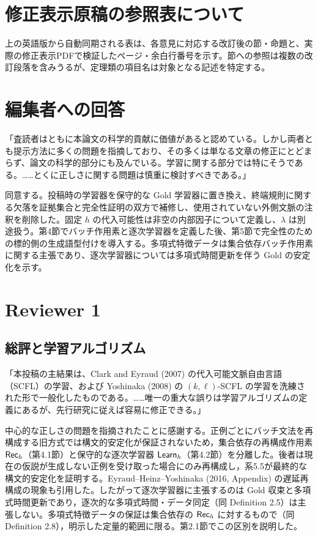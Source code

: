 
\section*{修正表示原稿の参照表について}
上の英語版から自動同期される表は、各意見に対応する改訂後の節・命題と、実際の修正表示PDFで検証したページ・余白行番号を示す。節への参照は複数の改訂段落を含みうるが、定理類の項目名は対象となる記述を特定する。

\section*{編集者への回答}
「査読者はともに本論文の科学的貢献に価値があると認めている。しかし両者とも提示方法に多くの問題を指摘しており、その多くは単なる文章の修正にとどまらず、論文の科学的部分にも及んでいる。学習に関する部分では特にそうである。……とくに正しさに関する問題は慎重に検討すべきである。」

\Reply
同意する。投稿時の学習器を保守的な Gold 学習器に置き換え、終端規則に関する欠落を証拠集合と完全性証明の双方で補修し、使用されていない外側文脈の注釈を削除した。固定 $h$ の代入可能性は非空の内部因子について定義し、$\lambda$ は別途扱う。第4節でバッチ作用素と逐次学習器を定義した後、第5節で完全性のための標的側の生成語型付けを導入する。多項式特徴データは集合依存バッチ作用素に関する主張であり、逐次学習器については多項式時間更新を伴う Gold の安定化を示す。

\section*{Reviewer 1}
\subsection*{総評と学習アルゴリズム}

「本投稿の主結果は、Clark and Eyraud (2007) の代入可能文脈自由言語（SCFL）の学習、および Yoshinaka (2008) の $(k,\ell)$-SCFL の学習を洗練された形で一般化したものである。……唯一の重大な誤りは学習アルゴリズムの定義にあるが、先行研究に従えば容易に修正できる。」

\Reply
中心的な正しさの問題を指摘されたことに感謝する。正例ごとにバッチ文法を再構成する旧方式では構文的安定化が保証されないため，集合依存の再構成作用素 $\mathsf{Rec}_h$（第4.1節）と保守的な逐次学習器 $\mathsf{Learn}_h$（第4.2節）を分離した。後者は現在の仮説が生成しない正例を受け取った場合にのみ再構成し，系5.5が最終的な構文的安定化を証明する。Eyraud--Heinz--Yoshinaka (2016, Appendix) の遅延再構成の現象も引用した。したがって逐次学習器に主張するのは Gold 収束と多項式時間更新であり，逐次的な多項式時間・データ同定（同 Definition 2.5）は主張しない。多項式特徴データの保証は集合依存の $\mathsf{Rec}_h$ に対するもので（同 Definition 2.8），明示した定量的範囲に限る。第2.1節でこの区別を説明した。

